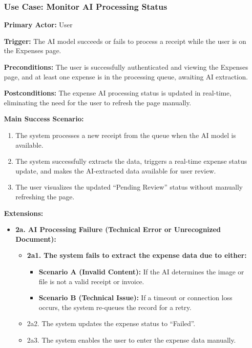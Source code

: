 \newpage

\subsubsection{\textbf{Use Case: Monitor AI Processing Status}}

\textbf{Primary Actor:} User

\textbf{Trigger:} The AI model succeeds or fails to process a receipt while the user is on the Expenses page.

\textbf{Preconditions:} The user is successfully authenticated and viewing the Expenses page, and at least one expense is in the processing queue, awaiting AI extraction.

\textbf{Postconditions:} The expense AI processing status is updated in real-time, eliminating the need for the user to refresh the page manually.

\vspace{0.5cm}

\textbf{Main Success Scenario:}

\begin{enumerate} [leftmargin=0.75cm, noitemsep]
    \item The system processes a new receipt from the queue when the AI model is available.
    \item The system successfully extracts the data, triggers a real-time expense status update, and makes the AI-extracted data available for user review.
    \item The user visualizes the updated ``Pending Review'' status without manually refreshing the page.
\end{enumerate}

\vspace{0.3cm}

\textbf{Extensions:}

\begin{itemize} [label={}, leftmargin=0.75cm, noitemsep]
    \item \textbf{2a. AI Processing Failure (Technical Error or Unrecognized Document):}
    \begin{itemize} [label={}, leftmargin=0.75cm, noitemsep]
        \item \textbf{2a1. The system fails to extract the expense data due to either:}
        \begin{itemize} [label={}, leftmargin=0.75cm, noitemsep]
            \item \textbf{Scenario A (Invalid Content):} If the AI determines the image or file is not a valid receipt or invoice.
            \item \textbf{Scenario B (Technical Issue):} If a timeout or connection loss occurs, the system re-queues the record for a retry.
        \end{itemize}
        \item 2a2. The system updates the expense status to ``Failed''.
        \item 2a3. The system enables the user to enter the expense data manually.
    \end{itemize}
\end{itemize}